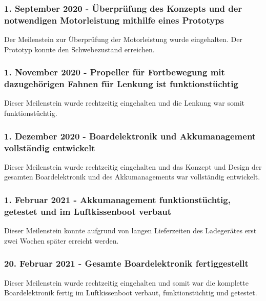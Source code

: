 
\subsubsection*{1. September 2020 - Überprüfung des Konzepts und der notwendigen Motorleistung mithilfe eines Prototyps}
Der Meilenstein zur Überprüfung der Motorleistung wurde eingehalten. Der Prototyp konnte den Schwebezustand erreichen. \\

\subsubsection*{1. November 2020 - Propeller für Fortbewegung mit dazugehörigen Fahnen für Lenkung ist funktionstüchtig}
Dieser Meilenstein wurde rechtzeitig eingehalten und die Lenkung war somit \\ funktionstüchtig. \\

\subsubsection*{1. Dezember 2020 - Boardelektronik und  Akkumanagement vollständig entwickelt}
Dieser Meilenstein wurde rechtzeitig eingehalten und das Konzept und Design der gesamten Boardelektronik und des Akkumanagements war vollständig entwickelt. \\

\subsubsection*{1. Februar 2021 - Akkumanagement funktionstüchtig, getestet und im Luftkissenboot verbaut}
Dieser Meilenstein konnte aufgrund von langen Lieferzeiten des Ladegerätes erst zwei Wochen später erreicht werden. \\

\subsubsection*{20. Februar 2021 - Gesamte Boardelektronik fertiggestellt}
Dieser Meilenstein wurde rechtzeitig eingehalten und somit war die komplette \\ Boardelektronik fertig im Luftkissenboot verbaut, funktionstüchtig und getestet. \\ 

